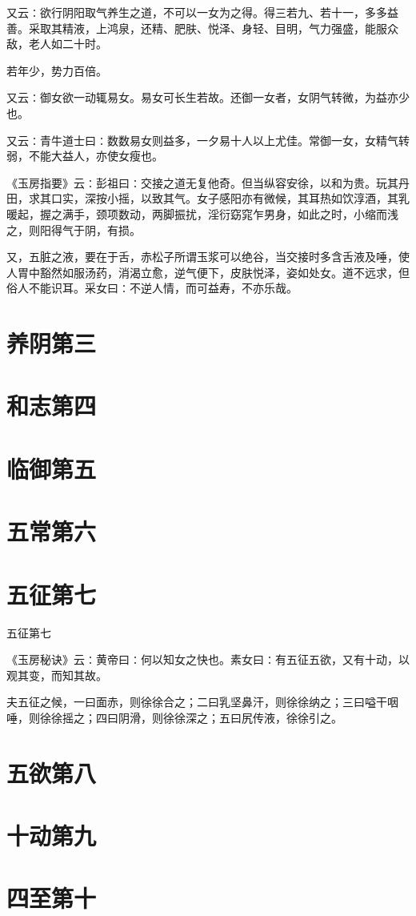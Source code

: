 \documentclass[a4paper,12pt,UTF8,twoside]{ctexbook}
\begin{document}
又云∶欲行阴阳取气养生之道，不可以一女为之得。得三若九、若十一，多多益善。采取其精液，上鸿泉，还精、肥肤、悦泽、身轻、目明，气力强盛，能服众敌，老人如二十时。

若年少，势力百倍。

又云∶御女欲一动辄易女。易女可长生若故。还御一女者，女阴气转微，为益亦少也。

又云∶青牛道士曰∶数数易女则益多，一夕易十人以上尤佳。常御一女，女精气转弱，不能大益人，亦使女瘦也。

《玉房指要》云∶彭祖曰∶交接之道无复他奇。但当纵容安徐，以和为贵。玩其丹田，求其口实，深按小摇，以致其气。女子感阳亦有微候，其耳热如饮淳酒，其乳暖起，握之满手，颈项数动，两脚振扰，淫衍窈窕乍男身，如此之时，小缩而浅之，则阳得气于阴，有损。

又，五脏之液，要在于舌，赤松子所谓玉浆可以绝谷，当交接时多含舌液及唾，使人胃中豁然如服汤药，消渴立愈，逆气便下，皮肤悦泽，姿如处女。道不远求，但俗人不能识耳。采女曰∶不逆人情，而可益寿，不亦乐哉。

\chapter{养阴第三}
\chapter{和志第四}
\chapter{临御第五}
\chapter{五常第六}
\chapter{五征第七}
五征第七

《玉房秘诀》云∶黄帝曰∶何以知女之快也。素女曰∶有五征五欲，又有十动，以观其变，而知其故。

夫五征之候，一曰面赤，则徐徐合之；二曰乳坚鼻汗，则徐徐纳之；三曰嗌干咽唾，则徐徐摇之；四曰阴滑，则徐徐深之；五曰尻传液，徐徐引之。
\chapter{五欲第八}
\chapter{十动第九}
\chapter{四至第十}
\end{document}
